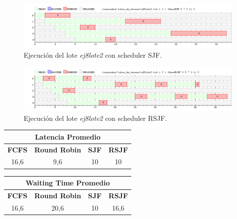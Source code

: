 \begin{figure}[!h]
	\begin{center}
		\includegraphics[width=500px]{imagenes/ej8_prueba2_sjf.png}
		\caption{Ejecución del lote \emph{ej8lote2} con scheduler SJF.}
		\label{fig:grafico_ej8_prueba2_sjf}
	\end{center}
\end{figure}

\newpage

\begin{figure}[!h]
	\begin{center}
		\includegraphics[width=500px]{imagenes/ej8_prueba2_rsjf.png}
		\caption{Ejecución del lote \emph{ej8lote2} con scheduler RSJF.}
		\label{fig:grafico_ej8_prueba2_rsjf}
	\end{center}
\end{figure}

\begin{center}
	\begin{tabular}{|c|c|c|c|}
		\hline
		\multicolumn{4}{|c|}{\large{\textbf{Latencia Promedio}}} \\
		\hline
		\textbf{FCFS} & \textbf{Round Robin} & \textbf{SJF} & \textbf{RSJF} \\
		\hline
		16,6 & 9,6 & 10 & 10 \\
		\hline
	\end{tabular}
\end{center}

\begin{center}
	\begin{tabular}{|c|c|c|c|}
		\hline
		\multicolumn{4}{|c|}{\large{\textbf{Waiting Time Promedio}}} \\
		\hline
		\textbf{FCFS} & \textbf{Round Robin} & \textbf{SJF} & \textbf{RSJF} \\
		\hline
		16,6 & 20,6 & 10 & 16,6 \\
		\hline
	\end{tabular}
\end{center}

